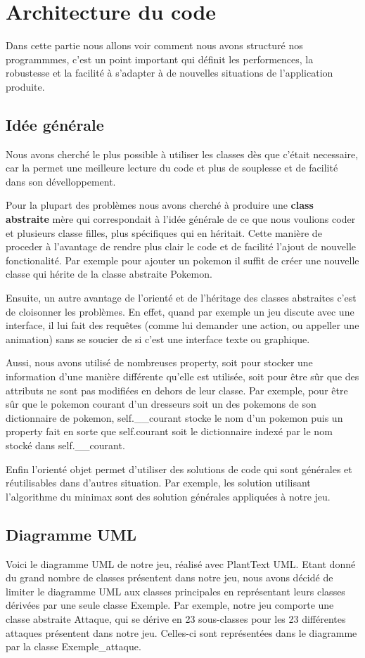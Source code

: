 \section{Architecture du code}
    Dans cette partie nous allons voir comment nous avons structuré nos programmmes, c'est un point important qui définit les performences, la robustesse et la facilité à s'adapter à de nouvelles situations de l'application produite.
    \subsection{Idée générale}
        Nous avons cherché le plus possible à utiliser les classes dès que c'était necessaire, car la  permet une meilleure lecture du code et plus de souplesse et de facilité dans son dévelloppement.
        
        Pour la plupart des problèmes nous avons cherché à produire une \textbf{class abstraite} mère qui correspondait à l'idée générale de ce que nous voulions coder et plusieurs classe filles, plus spécifiques qui en héritait. Cette manière de proceder à l'avantage de rendre plus clair le code et de facilité l'ajout de nouvelle fonctionalité. Par exemple pour ajouter un pokemon il suffit de créer une nouvelle classe qui hérite de la classe abstraite Pokemon. 
        
        Ensuite, un autre avantage de l'orienté et de l'héritage des classes abstraites c'est de cloisonner les problèmes. En effet, quand par exemple un jeu discute avec une interface, il lui fait des requêtes (comme lui demander une action, ou appeller une animation) sans se soucier de si c'est une interface texte ou graphique.
        
        Aussi, nous avons utilisé de nombreuses property, soit pour stocker une information d'une manière différente qu'elle est utilisée, soit pour être sûr que des attributs ne sont pas modifiées en dehors de leur classe. Par exemple, pour être sûr que le pokemon courant d'un dresseurs soit un des pokemons de son dictionnaire de pokemon, self.\_\_courant stocke le nom d'un pokemon puis un property fait en sorte que self.courant soit le dictionnaire indexé par le nom stocké dans self.\_\_courant.
        
        Enfin l'orienté objet permet d'utiliser des solutions de code qui sont générales et réutilisables dans d'autres situation. Par exemple, les solution utilisant l'algorithme du minimax sont des solution générales appliquées à notre jeu.
    \subsection{Diagramme UML}
        Voici le diagramme UML de notre jeu, réalisé avec PlantText UML. Etant donné du grand nombre de classes présentent dans notre jeu, nous avons décidé de limiter le diagramme UML aux classes principales en représentant leurs classes dérivées par une seule classe Exemple. Par exemple, notre jeu comporte une classe abstraite Attaque, qui se dérive en 23 sous-classes pour les 23 différentes attaques présentent dans notre jeu. Celles-ci sont représentées dans le diagramme par la classe Exemple\_attaque.

